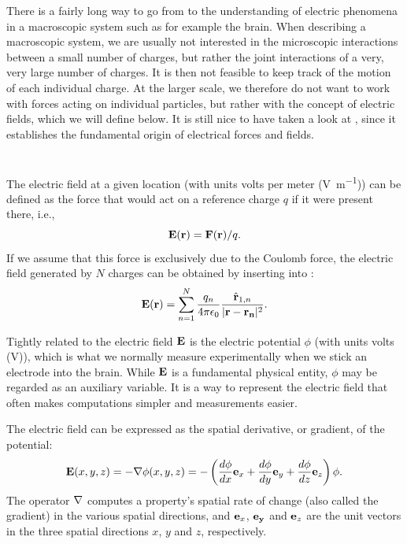 There is a fairly long way to go from  to the understanding of electric phenomena in a macroscopic system such as for example the brain. When describing a macroscopic system, we are usually not interested in the microscopic interactions between a small number of charges, but rather the joint interactions of a very, very large number of charges. It is then not feasible to keep track of the motion of each individual charge. At the larger scale, we therefore do not want to work with forces acting on individual particles, but rather with the concept of electric fields, which we will define below. It is still nice to have taken a look at , since it establishes the fundamental origin of electrical forces and fields. 


\section{}
\label{sec:Basics:Fields} 

The electric field at a given location (with units volts per meter (\si{\volt\per\metre})) can be defined as the force that would act on a reference charge $q$ if it were present there, i.e., 
\begin{equation}
{\bf E}({\bf r}) = {\bf F}({\bf r})/q.
\label{eq:Basics:E}
\end{equation}
If we assume that this force is exclusively due to the Coulomb force, the electric field generated by $N$ charges can be obtained by inserting  into :
\begin{equation}
{\bf E}({\bf r}) = \sum_{n=1}^{N}  \frac{q_n}{4\pi \epsilon_0} \frac{\hat{{\bf r}}_{1,n}}{|{\bf r}-{\bf r_n}|^2}.
\label{eq:Basics:CoulombEN}
\end{equation}

Tightly related to the electric field ${\bf E}$ is the electric potential $\phi$ (with units volts (\si{\volt})), which is what we normally measure experimentally when we stick an electrode into the brain. While ${\bf E}$ is a fundamental physical entity, $\phi$ may be regarded as an auxiliary variable. It is a way to represent the electric field that often makes computations simpler and measurements easier. 

The electric field can be expressed as the spatial derivative, or gradient, of the potential:
\begin{equation}
{\bf E}(x,y,z) = - {\bf \nabla} \phi(x,y,z) = - \left(\frac{d\phi}{dx} {\bf e}_x  + \frac{d\phi}{dy} {\bf e}_y + \frac{d\phi}{dz} {\bf e}_z \right) \phi.
\label{eq:Basics:EV}
\end{equation}
The operator ${\bf \nabla}$ computes a property's spatial rate of change (also called the gradient) in the various spatial directions, and ${\bf e}_x$, ${\bf e_y}$ and  ${\bf e}_z$ are the unit vectors in the three spatial directions $x$, $y$ and $z$, respectively. 

